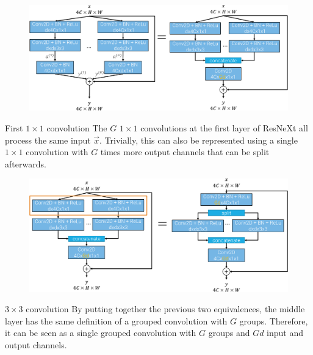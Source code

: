 \begin{description}
\begin{description}
\begin{descriptionlist}
                        \begin{figure}[H]
                            \centering
                            \includegraphics[width=0.8\linewidth]{./img/_resnext_to_resnet_l3.pdf}
                        \end{figure}

                    \item[First $1 \times 1$ convolution] 
                        The $G$ $1 \times 1$ convolutions at the first layer of ResNeXt all process the same input $\vec{x}$. Trivially, this can also be represented using a single $1 \times 1$ convolution with $G$ times more output channels that can be split afterwards.

                        \begin{figure}[H]
                            \centering
                            \includegraphics[width=0.8\linewidth]{./img/_resnext_to_resnet_l1.pdf}
                        \end{figure}

                    \item[$3 \times 3$ convolution] 
                        By putting together the previous two equivalences, the middle layer has the same definition of a grouped convolution with $G$ groups. Therefore, it can be seen as a single grouped convolution with $G$ groups and $Gd$ input and output channels.


\end{descriptionlist}
\end{description}
\end{description}
